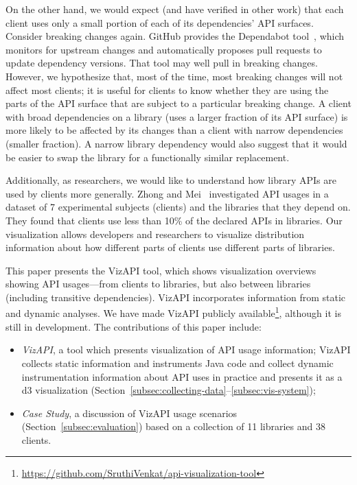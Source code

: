 On the other hand, we would expect (and have verified in other work) that each client uses only a small portion of each of its dependencies' API surfaces. Consider breaking changes again. GitHub provides the Dependabot tool~\cite{mullans20:_keep_depen}, which monitors for upstream changes and automatically proposes pull requests to update dependency versions. That tool may well pull in breaking changes. However, we hypothesize that, most of the time, most breaking changes will not affect most clients; it is useful for clients to know whether they are using the parts of the API surface that are subject to a particular breaking change. A client with broad dependencies on a library (uses a larger fraction of its API surface) is more likely to be affected by its changes than a client with narrow dependencies (smaller fraction). A narrow library dependency would also suggest that it would be easier to swap the library for a functionally similar replacement.

Additionally, as researchers, we would like to understand how library
APIs are used by clients more generally. Zhong and
Mei~\cite{zhong19:_empir_study_api_usages} investigated API usages in
a dataset of 7 experimental subjects (clients) and the libraries that
they depend on.  They found that clients use less than 10\% of the
declared APIs in libraries. Our visualization allows developers and
researchers to visualize distribution information about how different
parts of clients use different parts of libraries.

This paper presents the VizAPI tool, which shows visualization overviews showing API usages---from clients to libraries, but also between libraries (including transitive dependencies). VizAPI incorporates information from static and dynamic analyses.  We have made VizAPI publicly available\footnote{\url{https://github.com/SruthiVenkat/api-visualization-tool}}, although it is still in development. The contributions of this paper include:


\begin{itemize}

\item \emph{VizAPI}, a tool which presents visualization of API usage information; VizAPI collects static information and instruments Java code and collect dynamic instrumentation information about API uses in practice and presents it as a d3 visualization (Section~\ref{subsec:collecting-data}--\ref{subsec:vis-system});
\item \emph{Case Study}, a discussion of VizAPI usage scenarios (Section~\ref{subsec:evaluation}) based on a collection of 11 libraries and 38 clients.
\end{itemize}


